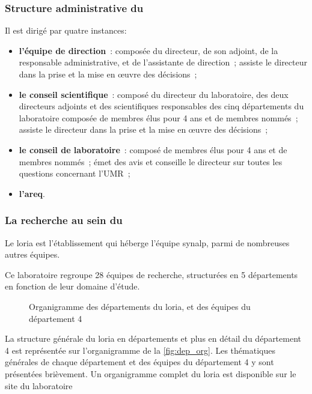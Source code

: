 \subsubsection*{Structure administrative du }
Il est dirigé par quatre instances:
\begin{itemize}
	\item \textbf{l'équipe de direction}~: composée du directeur, de son adjoint, de la responsable administrative, et de l'assistante de direction~; assiste le directeur dans la prise et la mise en œuvre des décisions~;
	\item \textbf{le conseil scientifique}~: composé du directeur du laboratoire, des deux directeurs adjoints et des scientifiques responsables des cinq départements du laboratoire composée de membres élus pour 4 ans et de membres nommés~; assiste le directeur dans la prise et la mise en œuvre des décisions~;
	\item \textbf{le conseil de laboratoire}~: composé de membres élus pour 4 ans et de membres nommés~; émet des avis et conseille le directeur sur toutes les questions concernant l’UMR~;
	\item \textbf{l'\gls{areq}}.
\end{itemize}

\subsubsection*{La recherche au sein du }
Le \gls{loria} est l'établissement qui héberge l'équipe \gls{synalp}, parmi de nombreuses autres équipes.

Ce laboratoire regroupe 28 équipes de recherche, structurées en 5 départements en fonction de leur domaine d'étude.

\begin{figure}[h]
	\centering
	\scalebox{1}{}
	\caption{Organigramme des départements du \gls{loria}, et des équipes du département 4}
	\label{fig:dep_org}
\end{figure}

La structure générale du \gls{loria} en départements et plus en détail du département 4 est représentée sur l'organigramme de la \autoref{fig:dep_org}. %
Les thématiques générales de chaque département et des équipes du département 4 y sont présentées brièvement.
Un organigramme complet du \gls{loria} est disponible sur {le site du laboratoire }

